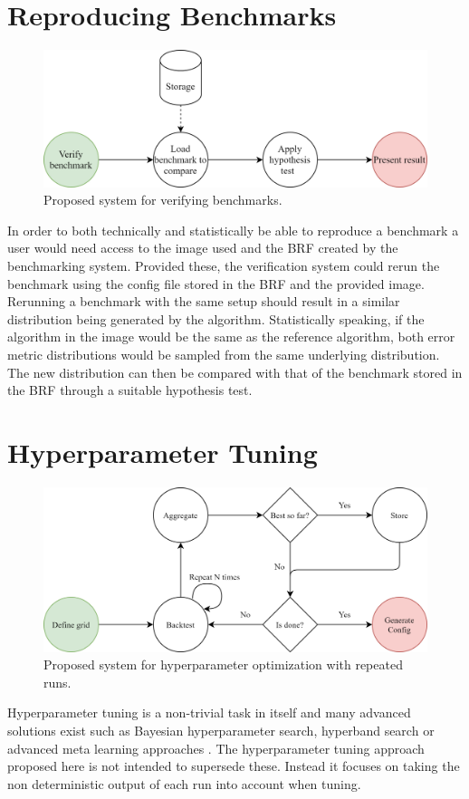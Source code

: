 \section{Reproducing Benchmarks}
\label{sec:reproduce_benchmarks}
\begin{figure}[h]
  \centering
  \includegraphics[width=\linewidth]{./img/verify_benchmark.png}
  \caption{Proposed system for verifying benchmarks.}
  \label{fig:proposed_validation_system}
\end{figure}

In order to both technically and statistically be able to reproduce a benchmark a user would need access to the image used and the BRF created by the benchmarking system. Provided these, the verification system could rerun the benchmark using the config file stored in the BRF and the provided image. Rerunning a benchmark with the same setup should result in a similar distribution being generated by the algorithm. Statistically speaking, if the algorithm in the image would be the same as the reference algorithm, both error metric distributions would be sampled from the same underlying distribution. The new distribution can then be compared with that of the benchmark stored in the BRF through a suitable hypothesis test.

\section{Hyperparameter Tuning}
\label{sec:hpo}
\begin{figure}[h]
  \centering
  \includegraphics[width=\linewidth]{./img/tuning_overview.png}
  \caption{Proposed system for hyperparameter optimization with repeated runs.}
  \label{fig:proposed_hyperparameter_tuning}
\end{figure}
Hyperparameter tuning is a non-trivial task in itself and many advanced solutions exist such as Bayesian hyperparameter search, hyperband search or advanced meta learning approaches \cite{snoek2012practical,feurer2019hyperparameter, li2017hyperband}. The hyperparameter tuning approach proposed here is not intended to supersede these. Instead it focuses on taking the non deterministic output of each run into account when tuning.

